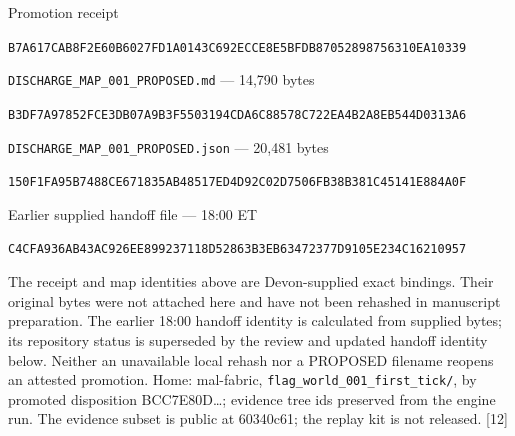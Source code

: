 \documentclass[
]{article}
\begin{document}
Promotion receipt

\nolinkurl{B7A617CAB8F2E60B6027FD1A0143C692ECCE8E5BFDB87052898756310EA10339}

\nolinkurl{DISCHARGE_MAP_001_PROPOSED.md} --- 14,790 bytes

\nolinkurl{B3DF7A97852FCE3DB07A9B3F5503194CDA6C88578C722EA4B2A8EB544D0313A6}

\nolinkurl{DISCHARGE_MAP_001_PROPOSED.json} --- 20,481 bytes

\nolinkurl{150F1FA95B7488CE671835AB48517ED4D92C02D7506FB38B381C45141E884A0F}

Earlier supplied handoff file --- 18:00 ET

\nolinkurl{C4CFA936AB43AC926EE899237118D52863B3EB63472377D9105E234C16210957}

The receipt and map identities above are Devon-supplied exact bindings.
Their original bytes were not attached here and have not been rehashed
in manuscript preparation. The earlier 18:00 handoff identity is
calculated from supplied bytes; its repository status is superseded by
the review and updated handoff identity below. Neither an unavailable
local rehash nor a PROPOSED filename reopens an attested promotion.
Home: mal-fabric, \nolinkurl{flag_world_001_first_tick/}, by promoted
disposition BCC7E80D\ldots; evidence tree ids preserved from the engine
run. The evidence subset is public at 60340c61; the replay kit is not
released. {[}12{]}
\end{document}
